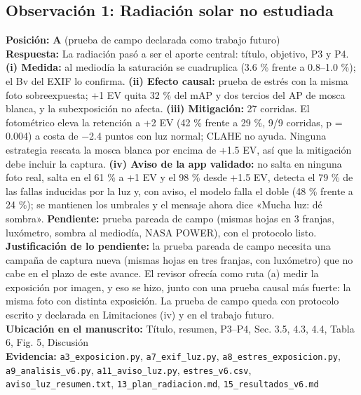 \documentclass[11pt,a4paper]{article}
\begin{document}
\subsection*{Observación 1: Radiación solar no estudiada}
\noindent\textbf{Posición:} \textbf{A} (prueba de campo declarada como trabajo futuro)\\
\textbf{Respuesta:} La radiación pasó a ser el aporte central: título, objetivo, P3 y P4. \textbf{(i) Medida:} al mediodía la saturación se cuadruplica (3.6 \% frente a 0.8–1.0 \%); el Bv del EXIF lo confirma. \textbf{(ii) Efecto causal:} prueba de estrés con la misma foto sobreexpuesta; +1 EV quita 32 \% del mAP y dos tercios del AP de mosca blanca, y la subexposición no afecta. \textbf{(iii) Mitigación:} 27 corridas. El fotométrico eleva la retención a +2 EV (42 \% frente a 29 \%, 9/9 corridas, p = 0.004) a costa de $-$2.4 puntos con luz normal; CLAHE no ayuda. Ninguna estrategia rescata la mosca blanca por encima de +1.5 EV, así que la mitigación debe incluir la captura. \textbf{(iv) Aviso de la app validado:} no salta en ninguna foto real, salta en el 61 \% a +1 EV y el 98 \% desde +1.5 EV, detecta el 79 \% de las fallas inducidas por la luz y, con aviso, el modelo falla el doble (48 \% frente a 24 \%); se mantienen los umbrales y el mensaje ahora dice «Mucha luz: dé sombra». \textbf{Pendiente:} prueba pareada de campo (mismas hojas en 3 franjas, luxómetro, sombra al mediodía, NASA POWER), con el protocolo listo. \textbf{Justificación de lo pendiente:} la prueba pareada de campo necesita una campaña de captura nueva (mismas hojas en tres franjas, con luxómetro) que no cabe en el plazo de este avance. El revisor ofrecía como ruta (a) medir la exposición por imagen, y eso se hizo, junto con una prueba causal más fuerte: la misma foto con distinta exposición. La prueba de campo queda con protocolo escrito y declarada en Limitaciones (iv) y en el trabajo futuro.\\
\textbf{Ubicación en el manuscrito:} Título, resumen, P3–P4, Sec. 3.5, 4.3, 4.4, Tabla 6, Fig. 5, Discusión\\
\textbf{Evidencia:} \texttt{a3\_exposicion.py}, \texttt{a7\_exif\_luz.py}, \texttt{a8\_estres\_exposicion.py}, \texttt{a9\_analisis\_v6.py}, \texttt{a11\_aviso\_luz.py}, \texttt{estres\_v6.csv}, \texttt{aviso\_luz\_resumen.txt}, \texttt{13\_plan\_radiacion.md}, \texttt{15\_resultados\_v6.md}
\end{document}
